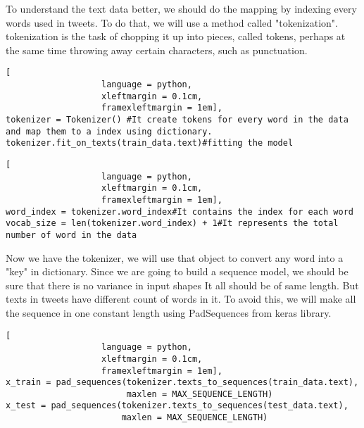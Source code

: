 To understand the text data better, we should do the mapping by indexing every words used in tweets. To do that, we will
use a method called "tokenization". tokenization is the task of chopping it up into pieces, called tokens, perhaps at the same time throwing away certain characters, such as punctuation.


\begin{lstlisting}[
                   language = python,
                   xleftmargin = 0.1cm,
                   framexleftmargin = 1em],
tokenizer = Tokenizer() #It create tokens for every word in the data and map them to a index using dictionary.
tokenizer.fit_on_texts(train_data.text)#fitting the model
\end{lstlisting}


\begin{lstlisting}[
                   language = python,
                   xleftmargin = 0.1cm,
                   framexleftmargin = 1em],
word_index = tokenizer.word_index#It contains the index for each word
vocab_size = len(tokenizer.word_index) + 1#It represents the total number of word in the data
\end{lstlisting}

Now we have the tokenizer, we will use that object to convert any word into a "key" in dictionary. 
Since we are going to build a sequence model, we should be sure that there is no variance in input shapes
It all should be of same length. But texts in tweets have different count of words in it. 
To avoid this, we will make all the sequence in one constant length using PadSequences from keras library.


\begin{lstlisting}[
                   language = python,
                   xleftmargin = 0.1cm,
                   framexleftmargin = 1em],
x_train = pad_sequences(tokenizer.texts_to_sequences(train_data.text), 
                        maxlen = MAX_SEQUENCE_LENGTH)
x_test = pad_sequences(tokenizer.texts_to_sequences(test_data.text),
                       maxlen = MAX_SEQUENCE_LENGTH)

\end{lstlisting}
